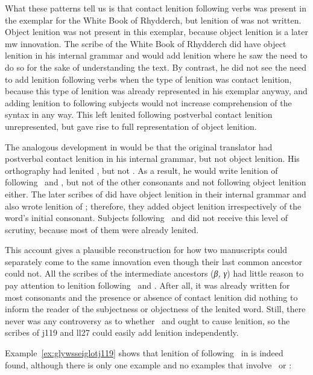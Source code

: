 What these patterns tell us is that contact lenition following verbs was present in the exemplar for the White Book of Rhydderch, but lenition of  was not written. Object lenition was not present in this exemplar, because object lenition is a later \gls{mw} innovation. The scribe of the White Book of Rhydderch did have object lenition in his internal grammar and would add lenition where he saw the need to do so for the sake of understanding the text. By contrast, he did not see the need to add lenition following verbs when the type of lenition was contact lenition, because this type of lenition was already represented in his exemplar anyway, and adding lenition to following subjects would not increase comprehension of the syntax  in any way. This left lenited  following postverbal contact lenition unrepresented, but gave rise to full representation of object lenition.

The analogous development in  would be that the original translator had postverbal contact lenition in his internal grammar, but not object lenition. His orthography had lenited , but not . As a result, he would write lenition of  following \ei\ and , but not of the other consonants and not following object lenition either. The later scribes of  did have object lenition in their internal grammar and also wrote lenition of ; therefore, they added object lenition irrespectively of the word's initial consonant. Subjects following \ei\ and  did not receive this level of scrutiny, because most of them were already lenited.

This account gives a plausible reconstruction for how two manuscripts could separately come to the same innovation even though their last common ancestor could not. All the scribes of the intermediate ancestors (\textit{β, γ}) had little reason to pay attention to lenition following \ei\ and . After all, it was already written for most consonants and the presence or absence of contact lenition did nothing to inform the reader of the subjectness or objectness of the lenited word. Still, there never was any controversy as to whether \ei\ and  ought to cause lenition, so the scribes of \gls{j119} and \gls{ll27} could easily add lenition independently.

Example~\ref{ex:glywsseiglotj119} shows that  lenition of  following \ei\ in  is indeed found, although there is only one example and no examples that involve \oes\ or :

